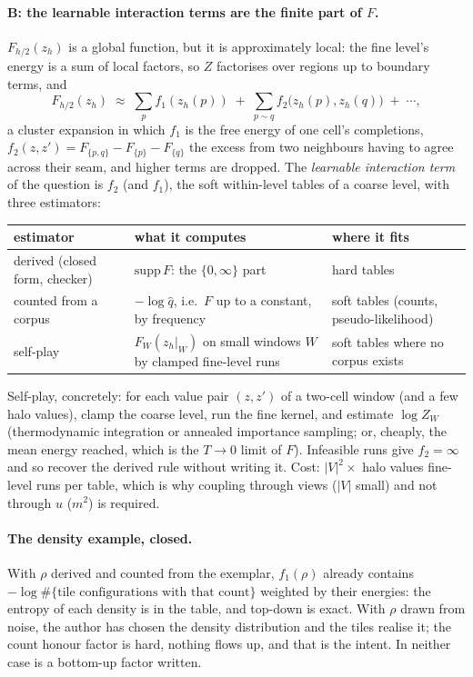 \documentclass[11pt]{article}
\newcommand{\1}{\mathds{1}}
\begin{document}
\paragraph{B: the learnable interaction terms are the finite part of $F$.}
$F_{h/2}(z_h)$ is a global function, but it is approximately local: the fine
level's energy is a sum of local factors, so $Z$ factorises over regions up to
boundary terms, and
\[
  F_{h/2}(z_h) \;\approx\; \sum_p f_1(z_h(p)) \;+\; \sum_{p \sim q} f_2\big(z_h(p), z_h(q)\big) \;+\; \cdots,
\]
a cluster expansion in which $f_1$ is the free energy of one cell's
completions, $f_2(z, z') = F_{\{p,q\}} - F_{\{p\}} - F_{\{q\}}$ the excess from two
neighbours having to agree across their seam, and higher terms are dropped. The
\emph{learnable interaction term} of the question is $f_2$ (and $f_1$), the
soft within-level tables of a coarse level, with three estimators:
\begin{center}
\small
\begin{tabular}{@{}lp{2.5in}p{1.8in}@{}}
\toprule
estimator & what it computes & where it fits \\
\midrule
derived (closed form, checker) & $\mathrm{supp}\,F$: the $\{0, \infty\}$ part & hard tables \\
counted from a corpus & $-\log \hat q$, i.e.\ $F$ up to a constant, by frequency & soft tables (counts, pseudo-likelihood) \\
self-play & $F_W(z_h|_W)$ on small windows $W$ by clamped fine-level runs & soft tables where no corpus exists \\
\bottomrule
\end{tabular}
\end{center}
Self-play, concretely: for each value pair $(z, z')$ of a two-cell window (and a
few halo values), clamp the coarse level, run the fine kernel, and estimate
$\log Z_W$ (thermodynamic integration or annealed importance sampling; or,
cheaply, the mean energy reached, which is the $T \to 0$ limit of $F$). Infeasible
runs give $f_2 = \infty$ and so recover the derived rule without writing it.
Cost: $|V|^2 \times$ halo values fine-level runs per table, which is why coupling
through views ($|V|$ small) and not through $u$ ($m^2$) is required.

\paragraph{The density example, closed.} With $\rho$ derived and counted from
the exemplar, $f_1(\rho)$ already contains $-\log \#\{\text{tile configurations
with that count}\}$ weighted by their energies: the entropy of each density
is in the table, and top-down is exact. With $\rho$ drawn from noise, the
author has chosen the density distribution and the tiles realise it; the
count honour factor is hard, nothing flows up, and that is the intent. In
neither case is a bottom-up factor written.
\end{document}
